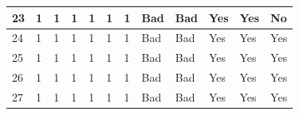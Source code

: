 \begin{table}[H]
\begin{tabular}{|l|l|l|l|l|l|l|l|l|l|l|l|}
23                                                          & 1  & 1    & 1   & 1     & 1    & 1                                                                     & Bad                                                     & Bad                                                      & Yes                                                                   & Yes                                                                   & No                                                                    \\ \hline
24                                                          & 1  & 1    & 1   & 1     & 1    & 1                                                                     & Bad                                                     & Bad                                                      & Yes                                                                   & Yes                                                                   & Yes                                                                   \\ \hline
25                                                          & 1  & 1    & 1   & 1     & 1    & 1                                                                     & Bad                                                     & Bad                                                      & Yes                                                                   & Yes                                                                   & Yes                                                                   \\ \hline
26                                                          & 1  & 1    & 1   & 1     & 1    & 1                                                                     & Bad                                                     & Bad                                                      & Yes                                                                   & Yes                                                                   & Yes                                                                   \\ \hline
27                                                          & 1  & 1    & 1   & 1     & 1    & 1                                                                     & Bad                                                     & Bad                                                      & Yes                                                                   & Yes                                                                   & Yes                                                                   \\ \hline

\end{tabular}
\end{table}
